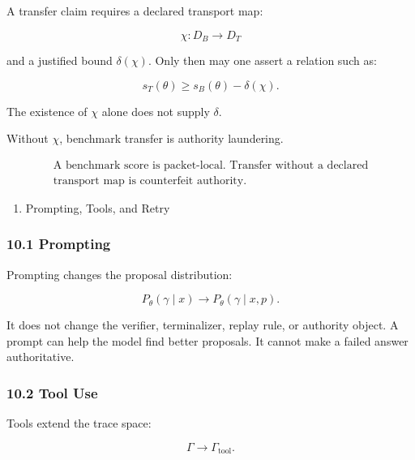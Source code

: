 \documentclass[
  10pt,
]{article}
\providecommand{\tightlist}{%
  \setlength{\itemsep}{0pt}\setlength{\parskip}{0pt}}
\providecommand{\tightlist}{%
  \setlength{\itemsep}{0pt}\setlength{\parskip}{0pt}}
\begin{document}
A transfer claim requires a declared transport map:

\protect\hypertarget{math-E0133-0178}{}{\[
\chi:D_B\to D_T
\]}

and a justified bound \protect\hypertarget{math-E0134-0179}{}{\(\delta(\chi)\)}. Only then may one assert a relation such as:

\protect\hypertarget{math-E0135-0180}{}{\[
s_T(\theta)\ge s_B(\theta)-\delta(\chi).
\]}

The existence of \protect\hypertarget{math-E0013-0181}{}{\(\chi\)} alone does not supply \protect\hypertarget{math-E0136-0182}{}{\(\delta\)}.

Without \protect\hypertarget{math-E0013-0183}{}{\(\chi\)}, benchmark transfer is authority laundering.

\protect\hypertarget{math-E0137-0184}{}{\[
\boxed{
\begin{gathered}\text{A benchmark score is packet-local. Transfer without a declared}\\
\text{transport map is counterfeit authority.}\end{gathered}
}
\]}

\begin{enumerate}
\def\labelenumi{\arabic{enumi}.}
\setcounter{enumi}{9}
\tightlist
\item
  Prompting, Tools, and Retry
\end{enumerate}

\subsubsection{10.1 Prompting}\label{prompting}

Prompting changes the proposal distribution:

\protect\hypertarget{math-E0138-0185}{}{\[
P_\theta(\gamma\mid x)\to P_\theta(\gamma\mid x,p).
\]}

It does not change the verifier, terminalizer, replay rule, or authority object. A prompt can help the model find better proposals. It cannot make a failed answer authoritative.

\subsubsection{10.2 Tool Use}\label{tool-use}

Tools extend the trace space:

\protect\hypertarget{math-E0139-0186}{}{\[
\Gamma\to\Gamma_{\mathrm{tool}}.
\]}
\end{document}

